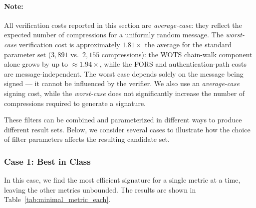 \paragraph{Note:}
All verification costs reported in this section are \emph{average-case}: they reflect the expected number of compressions for a uniformly random message.
The \emph{worst-case} verification cost is approximately $1.81\times$ the average for the standard parameter set ($3{,}891$ vs.\ $2{,}155$ compressions): the WOTS chain-walk component alone grows by up to ${\approx}1.94\times$, while the FORS and authentication-path costs are message-independent.
The worst case depends solely on the message being signed — it cannot be influenced by the verifier.
We also use an \emph{average-case} signing cost, while the \emph{worst-case} does not significantly increase the number of compressions required to generate a signature.
 

These filters can be combined and parameterized in different ways to produce different result sets. Below, we consider several cases to illustrate how the choice of filter parameters affects the resulting candidate set.

\subsubsection{Case 1: Best in Class}
In this case, we find the most efficient signature for a single metric at a time, leaving the other metrics unbounded. The results are shown in Table~\ref{tab:minimal_metric_each}.

